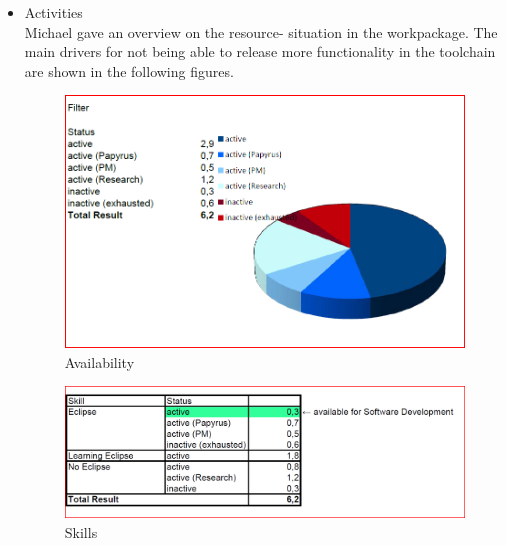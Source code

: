\documentclass[a4paper, 11pt]{article}
\begin{document}
\begin{itemize}
\item Activities\\
Michael gave an overview on the resource- situation in the workpackage.
The main drivers for not being able to release more functionality in the toolchain are shown in the following figures.

\begin{figure}
\includegraphics[width=\textwidth]{Figures/Availability.png}
\caption{Availability
\label{f:Availability}}
\end{figure}

\begin{figure}
\includegraphics[width=\textwidth]{Figures/Skills.png}
\caption{Skills
\label{f:Availability}}
\end{figure}


\end{itemize}
\end{document}
